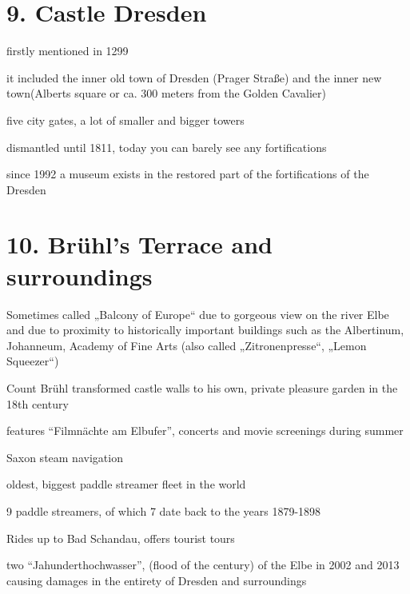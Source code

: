 \documentclass[a4paper,12pt]{report}
\begin{document}
\section{9. Castle Dresden}
\begin{itemize*}
\item firstly mentioned in 1299
\item it included the inner old town of Dresden (Prager Straße) and the inner new town(Alberts square or ca. 300 meters from the Golden Cavalier)
\item five city gates, a lot of smaller and bigger towers
\item dismantled until 1811, today you can barely see any fortifications
\item since 1992 a museum exists in the restored part of the fortifications of the Dresden
\end{itemize*}

\section{10. Brühl's Terrace and surroundings}
\begin{itemize*}
\item Sometimes called „Balcony of Europe“ due to gorgeous view on the river Elbe and due to proximity to historically important buildings such as the Albertinum, Johanneum, Academy of Fine Arts (also called „Zitronenpresse“, „Lemon Squeezer“)
\item Count Brühl transformed castle walls to his own, private pleasure garden in the 18th century
\item features “Filmnächte am Elbufer”, concerts and movie screenings during summer
\item Saxon steam navigation
    \begin{itemize*}
    \item oldest, biggest paddle streamer fleet in the world
    \item 9 paddle streamers, of which 7 date back to the years 1879-1898
    \item Rides up to Bad Schandau, offers tourist tours
    \end{itemize*}
\item two “Jahunderthochwasser”, (flood of the century) of the Elbe in 2002 and 2013 causing damages in the entirety of Dresden and surroundings
\end{itemize*}
\end{document}
